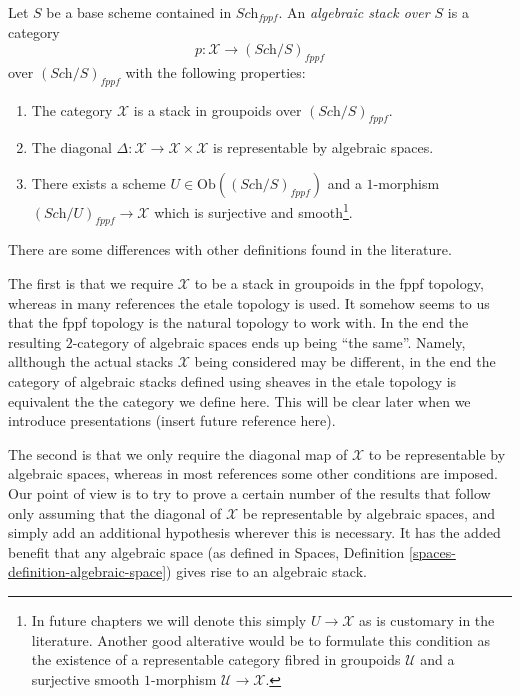 \begin{definition}
\label{definition-algebraic-stack}
Let $S$ be a base scheme contained in $\textit{Sch}_{fppf}$.
An {\it algebraic stack over $S$} is a category
$$
p : \mathcal{X} \to (\textit{Sch}/S)_{fppf}
$$
over $(\textit{Sch}/S)_{fppf}$ with the following properties:
\begin{enumerate}
\item The category $\mathcal{X}$ is a stack in groupoids over
$(\textit{Sch}/S)_{fppf}$.
\item The diagonal
$\Delta : \mathcal{X} \to \mathcal{X}\times\mathcal{X}$
is representable by algebraic spaces.
\item There exists a scheme $U \in \text{Ob}((\textit{Sch}/S)_{fppf})$
and a $1$-morphism $(\textit{Sch}/U)_{fppf} \to \mathcal{X}$
which is surjective and smooth\footnote{In future chapters we will denote
this simply $U \to \mathcal{X}$ as is customary in the literature. Another
good alterative would be to formulate this condition as the existence of a
representable category fibred in groupoids $\mathcal{U}$ and a surjective
smooth $1$-morphism $\mathcal{U} \to \mathcal{X}$.}.
\end{enumerate}
\end{definition}

\noindent
There are some differences with other definitions found in the literature.

\medskip\noindent
The first is that we require $\mathcal{X}$ to be a stack in groupoids
in the fppf topology, whereas in many references the etale topology is
used. It somehow seems to us that the fppf topology is the natural topology
to work with. In the end the resulting $2$-category of algebraic spaces
ends up being ``the same''. Namely, allthough the actual
stacks $\mathcal{X}$ being considered may be different, in the end the
category of algebraic stacks defined using sheaves in the etale topology
is equivalent the the category we define here. This will be clear later
when we introduce presentations (insert future reference here).

\medskip\noindent
The second is that we only require the diagonal map of $\mathcal{X}$ to be
representable by algebraic spaces, whereas in most references some other
conditions are imposed. Our point of view is to try to prove a certain
number of the results that follow only assuming that the diagonal
of $\mathcal{X}$ be representable by algebraic spaces, and simply add
an additional hypothesis wherever this is necessary. It has the added
benefit that any algebraic space (as defined in
Spaces, Definition \ref{spaces-definition-algebraic-space})
gives rise to an algebraic stack.

